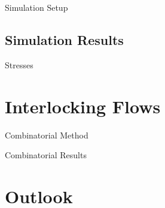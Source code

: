 \documentclass{beamer}
\numberwithin{equation}{aufgabe}
\begin{document}
\begin{frame}{Simulation Setup}
    
\end{frame}

\subsection{Simulation Results}
\begin{frame}{Stresses}
    
\end{frame}

\section{Interlocking Flows}
\begin{frame}{Combinatorial Method}
    
\end{frame}

\begin{frame}{Combinatorial Results}
    
\end{frame}

\section{Outlook}

\begin{frame}
    
\end{frame}

\appendix
\begin{frame}    
\printbibliography 
\end{frame}
\end{document}
